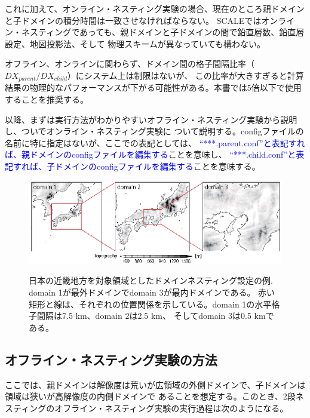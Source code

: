 これに加えて、オンライン・ネスティング実験の場合、現在のところ親ドメインと子ドメインの積分時間は一致させなければならない。
SCALEではオンライン・ネスティングであっても、親ドメインと子ドメインの間で鉛直層数、鉛直層設定、地図投影法、そして
物理スキームが異なっていても構わない。

オフライン、オンラインに関わらず、ドメイン間の格子間隔比率（$DX_{parent}/DX_{child}$）にシステム上は制限はないが、
この比率が大きすぎると計算結果の物理的なパフォーマンスが下がる可能性がある。本書では5倍以下で使用することを推奨する。

以降、まずは実行方法がわかりやすいオフライン・ネスティング実験から説明し、ついでオンライン・ネスティング実験に
ついて説明する。configファイルの名前に特に指定はないが、ここでの表記としては、
\textcolor{blue}{``***.parent.conf''と表記すれば、親ドメインのconfigファイルを編集する}ことを意味し、
\textcolor{blue}{``***.child.conf''と表記すれば、子ドメインのconfigファイルを編集する}ことを意味する。


\begin{figure}[t]
\begin{center}
  \includegraphics[width=1.0\hsize]{./figure/nesting_sample.eps}\\
  \caption{日本の近畿地方を対象領域としたドメインネスティング設定の例. domain 1が最外ドメインでdomain 3が最内ドメインである。
           赤い矩形と線は、それぞれの位置関係を示している。domain 1の水平格子間隔は7.5 km、domain 2は2.5 km、
           そしてdomain 3は0.5 kmである。}
  \label{fig_nestsample}
\end{center}
\end{figure}


\subsection{オフライン・ネスティング実験の方法} \label{sec:nest_offline}

ここでは、親ドメインは解像度は荒いが広領域の外側ドメインで、子ドメインは領域は狭いが高解像度の内側ドメインで
あることを想定する。このとき、2段ネスティングのオフライン・ネスティング実験の実行過程は次のようになる。

